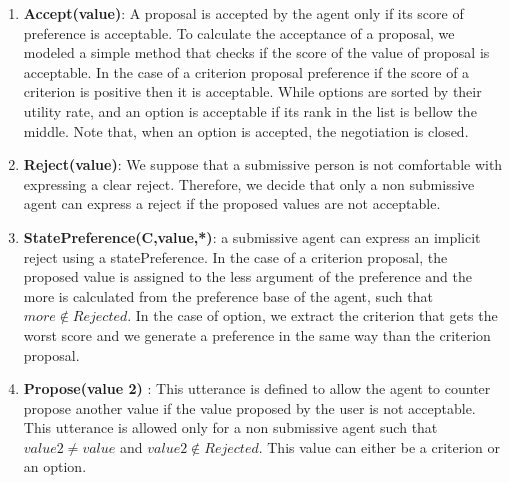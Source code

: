 \documentclass{llncs}
\begin{document}
		\begin{enumerate}
			
			\item \textbf{Accept(value)}: A proposal is accepted by the agent only if its score of preference is acceptable. To calculate the acceptance of a proposal, we modeled a simple method that checks if  the score of the value of proposal is acceptable. In the case of a criterion proposal  preference if the score of a criterion is positive then it is acceptable. While options are sorted by their utility rate, and an option is acceptable if its rank in the list is bellow the middle.  Note that, when an option is accepted, the negotiation is closed. 
			
			\item \textbf{Reject(value)}: We suppose that a submissive person is not comfortable with expressing a clear reject. Therefore, we decide that only a non submissive agent can express a reject if the proposed values are not acceptable. 
		
			\item \textbf{StatePreference(C,value,*)}: a submissive agent can express an implicit reject using a statePreference. In the case of a criterion proposal, the proposed value is assigned to the less argument of the preference and the more is calculated from the preference base of the agent, such that $more \notin Rejected$. In the case of option, we extract the criterion that gets the worst score and we generate a preference in the same way than the criterion proposal.
			
			\item \textbf{Propose(value 2)} : This utterance is defined to allow the agent to counter propose another value if the value proposed by the user is not acceptable. This utterance is allowed only for a non submissive agent such that $value2 \not = value$ and $value2 \notin Rejected$. This value can either be a criterion or an option.
	\end{enumerate}
	
\end{document}
